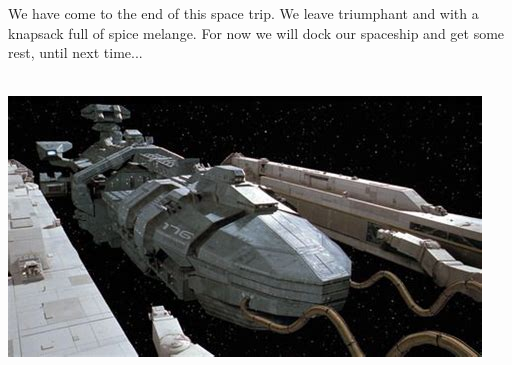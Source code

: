 \documentclass[letterpaper, 10pt]{article}
\begin{document}
We have come to the end of this space trip. We leave triumphant and with a knapsack full of spice melange. For now we will dock our spaceship and get some rest, until next time... 
\\
\\
\begin{center}
    \includegraphics[scale=0.4]{images/spaceShip.jpg}
\end{center}
\\
\end{document}
